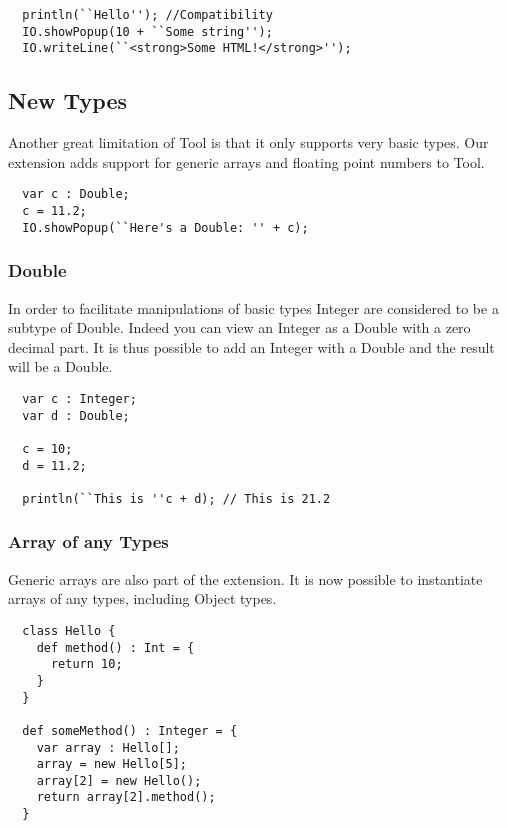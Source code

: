 \begin{lstlisting}
  println(``Hello''); //Compatibility
  IO.showPopup(10 + ``Some string'');
  IO.writeLine(``<strong>Some HTML!</strong>'');
\end{lstlisting}

\subsection{New Types}

Another great limitation of Tool is that it only supports very basic
types. Our extension adds support for generic arrays and floating
point numbers to Tool.

\begin{lstlisting}
  var c : Double;
  c = 11.2;
  IO.showPopup(``Here's a Double: '' + c);
\end{lstlisting}


\subsubsection{Double}

In order to facilitate manipulations of basic types Integer are
considered to be a subtype of Double. Indeed you can view an Integer
as a Double with a zero decimal part. It is thus possible to add an
Integer with a Double and the result will be a Double.

\begin{lstlisting}
  var c : Integer;
  var d : Double;

  c = 10;
  d = 11.2;

  println(``This is ''c + d); // This is 21.2
\end{lstlisting}

\subsubsection{Array of any Types}

Generic arrays are also part of the extension. It is now possible to
instantiate arrays of any types, including Object types.

\begin{lstlisting}
  class Hello {
    def method() : Int = {
      return 10;
    }
  }

  def someMethod() : Integer = {
    var array : Hello[];
    array = new Hello[5];
    array[2] = new Hello();
    return array[2].method();
  }
\end{lstlisting}

